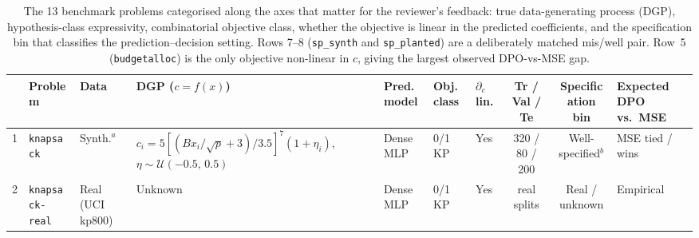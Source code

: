 %
%

\begin{table}
    \centering
    \caption[Benchmark problems categorised]{%
        The 13 benchmark problems categorised along the axes that matter
        for the reviewer's feedback: true data-generating process (DGP),
        hypothesis-class expressivity, combinatorial objective class,
        whether the objective is linear in the predicted coefficients,
        and the specification bin that classifies the
        prediction--decision setting.  Rows 7--8 (\texttt{sp\_synth} and
        \texttt{sp\_planted}) are a deliberately matched mis/well pair.
        Row~5 (\texttt{budgetalloc}) is the only objective non-linear in
        $c$, giving the largest observed DPO-vs-MSE gap.%
    }
    \label{tab:problem_categorization}
    \scriptsize
    \setlength{\tabcolsep}{3pt}
    \renewcommand{\arraystretch}{1.2}
    \begin{adjustbox}{max width=\linewidth}
    \begin{tabular}{@{}cllllllccl@{}}
        \toprule
          & \textbf{Problem}
          & \textbf{Data}
          & \textbf{DGP ($c = f(x)$)}
          & \textbf{Pred.\ model}
          & \textbf{Obj.\ class}
          & \textbf{$\partial_c$ lin.}
          & \textbf{Tr / Val / Te}
          & \textbf{Specification bin}
          & \textbf{Expected DPO vs.\ MSE} \\
        \midrule
        1  & \texttt{knapsack}
           & Synth.$^{a}$
           & \makecell[l]{$c_i = 5[(Bx_i/\sqrt{p}+3)/3.5]^{7}(1+\eta_i)$,\\
                         $\eta\!\sim\!\mathcal{U}(-0.5,\,0.5)$}
           & Dense MLP
           & 0/1 KP
           & Yes
           & 320 / 80 / 200
           & Well-specified$^{b}$
           & MSE tied / wins \\
        2  & \texttt{knapsack-real}
           & Real (UCI kp800)
           & Unknown
           & Dense MLP
           & 0/1 KP
           & Yes
           & real splits
           & Real / unknown
           & Empirical \\

\end{tabular}
\end{adjustbox}
\end{table}
